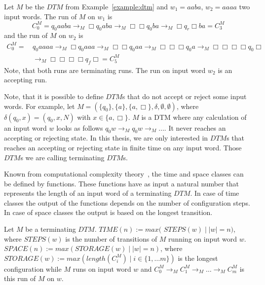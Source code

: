 \begin{example}
    \label{example:run_of_dtm}
    Let $M$ be the $\mathit{DTM}$ from Example~\ref{example:dtm} and $w_1 = aaba$, $w_2 = aaaa$ two input words. The
    run of $M$ on $w_1$ is
    \[C_0^M = q_0aaba \rightarrow_M \Box q_0aba \rightarrow_M \Box \Box q_0ba \rightarrow_M \Box q_r\Box ba = C_3^M\]
    and the run of $M$ on $w_2$ is
    \begin{align*}
        C_0^M =\,&q_0aaaa \rightarrow_M \Box q_0aaa \rightarrow_M \Box \Box q_0aa \rightarrow_M \Box \Box \Box q_0 a
        \rightarrow_M \Box \Box \Box \Box q_0 \Box \\
        &\rightarrow_M \Box \Box \Box \Box q_f \Box = C_5^M
    \end{align*}
    Note, that both runs are terminating runs. The run on input word $w_2$ is an accepting run.
\end{example}

Note, that it is possible to define $\mathit{DTM}$s that do not accept or reject some input words. For example, let
$M = (\{q_0\}, \{a\}, \{a, \Box\}, \delta, \emptyset, \emptyset)$, where $\delta(q_0, x) = (q_0, x, N)$ with $x \in
\{a, \Box\}$. $M$ is a DTM where any calculation of an input word $w$ looks as follows $q_0w \rightarrow_M q_0w
\rightarrow_M \dots$. It never reaches an accepting or rejecting state. In this thesis, we are only interested in
$\mathit{DTM}$s that reaches an accepting or rejecting state in finite time on any input word. Those $\mathit{DTM}$s
we are calling terminating $\mathit{DTM}$s.

Known from computational complexity theory~\cite{papadimitriou1994complexity}, the time and space classes
can be defined by functions. These functions have as input a natural number that represents the length of an input
word of a terminating $\mathit{DTM}$. In case of time classes the output of the functions depends on the number of
configuration steps. In case of space classes the output is based on the longest transition.

\begin{definition}
    Let $M$ be a terminating $\mathit{DTM}$. $\mathit{TIME}(n):= max($ $\mathit{STEPS}(w)\mid |w| = n)$, where
    $\mathit{STEPS}(w)$ is the number of transitions of $M$ running on input word $w$. $\mathit{SPACE}(n) := max
    (\mathit{STORAGE}(w)\mid |w| = n)$, where $\mathit{STORAGE}(w) := max(length(C_i^M)\mid i\in\{1, \dots m\})$ is
    the longest configuration while $M$ runs on input word $w$ and $C_0^M \rightarrow_M C_1^M \rightarrow_M \dots
    \rightarrow_M C_m^M$ is this run of $M$ on $w$.
\end{definition}

